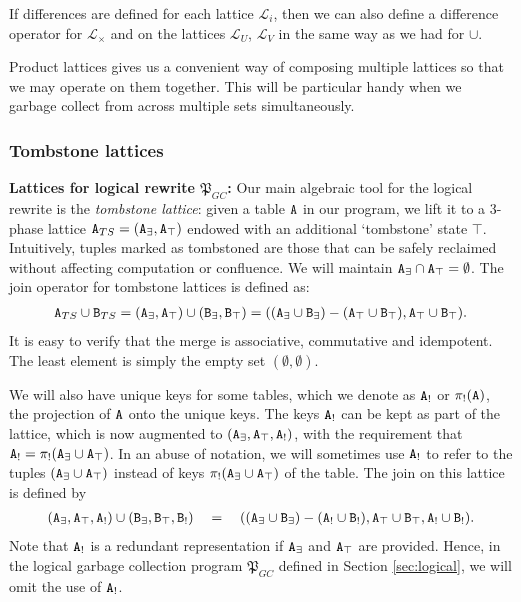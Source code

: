 If differences are defined for each lattice $\mathcal{L}_i$, then we can also define a difference operator for $\mathcal{L}_\times$ and on the lattices $\mathcal{L}_U$, $\mathcal{L}_V$ in the same way as we had for $\cup$.

Product lattices gives us a convenient way of composing multiple lattices so that we may operate on them together.
This will be particular handy when we garbage collect from across multiple sets simultaneously.


\subsubsection{Tombstone lattices}
\textbf{Lattices for logical rewrite $\mathfrak{P}_{GC}$:}
Our main algebraic tool for the logical rewrite is the \emph{tombstone lattice}:
given a table $\tt{A}$ in our program, we lift it to a 3-phase lattice $\tt{A}_{TS} = (\tt{A}_\exists, \tt{A}_\top)$ endowed with an additional `tombstone' state $\top$.
Intuitively, tuples marked as tombstoned are those that can be safely reclaimed without affecting computation or confluence.
We will maintain $\tt{A}_\exists \cap \tt{A}_\top = \emptyset$.
The join operator for tombstone lattices is defined as:
\begin{align*}
\tt{A}_{TS} \cup \tt{B}_{TS} = (\tt{A}_\exists, \tt{A}_\top) \cup (\tt{B}_\exists, \tt{B}_\top) = ((\tt{A}_\exists \cup \tt{B}_\exists) - (\tt{A}_\top \cup \tt{B}_\top), \tt{A}_\top \cup \tt{B}_\top).
\end{align*}
It is easy to verify that the merge is associative, commutative and idempotent.
The least element is simply the empty set $(\emptyset, \emptyset)$.

We will also have unique keys for some tables, which we denote as $\tt{A}_!$ or $\pi_!(\tt{A})$, the projection of $\tt{A}$ onto the unique keys.
The keys $\tt{A}_!$ can be kept as part of the lattice, which is now augmented to $(\tt{A}_\exists, \tt{A}_\top, \tt{A}_!)$, with the requirement that $\tt{A}_! = \pi_!(\tt{A}_\exists \cup \tt{A}_\top)$.
In an abuse of notation, we will sometimes use $\tt{A}_!$ to refer to the tuples $(\tt{A}_\exists \cup \tt{A}_\top)$ instead of keys $\pi_!(\tt{A}_\exists \cup \tt{A}_\top)$ of the table.
The join on this lattice is defined by
\begin{align*}
(\tt{A}_\exists, \tt{A}_\top, \tt{A}_!) \cup (\tt{B}_\exists, \tt{B}_\top, \tt{B}_!) \quad=\quad ((\tt{A}_\exists \cup \tt{B}_\exists) - (\tt{A}_! \cup \tt{B}_!), \tt{A}_\top \cup \tt{B}_\top, \tt{A}_! \cup \tt{B}_!).
\end{align*}
Note that $\tt{A}_!$ is a redundant representation if $\tt{A}_\exists$ and $\tt{A}_\top$ are provided.
Hence, in the logical garbage collection program $\mathfrak{P}_{GC}$ defined in Section \ref{sec:logical}, we will omit the use of $\tt{A}_!$.

